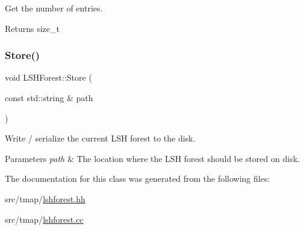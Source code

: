 Get the number of entries. 

\begin{DoxyReturn}{Returns}
size\+\_\+t 
\end{DoxyReturn}
\mbox{\label{classLSHForest_a758c5329128f5ab3723a98b77bbc4634}} 
\subsubsection{\texorpdfstring{Store()}{Store()}}
{\footnotesize\ttfamily void L\+S\+H\+Forest\+::\+Store (\begin{DoxyParamCaption}\item[{const std\+::string \&}]{path }\end{DoxyParamCaption})}



Write / serialize the current L\+SH forest to the disk. 


\begin{DoxyParams}{Parameters}
{\em path} & The location where the L\+SH forest should be stored on disk. \\
\hline
\end{DoxyParams}


The documentation for this class was generated from the following files\+:\begin{DoxyCompactItemize}
\item 
src/tmap/\hyperlink{lshforest_8hh}{lshforest.\+hh}\item 
src/tmap/\hyperlink{lshforest_8cc}{lshforest.\+cc}\end{DoxyCompactItemize}
